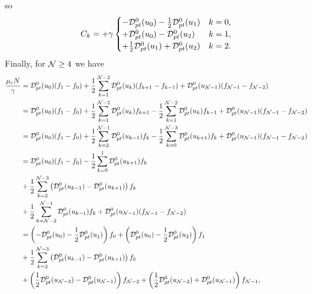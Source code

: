 \documentclass{book}
\begin{document}
so
\begin{equation}
	C_k = +\gamma\begin{cases}
			 -           {\cal D}_{pt}^0(u_0) - \frac{1}{2}{\cal D}_{pt}^0(u_{1}) & k=0, \\
			 +           {\cal D}_{pt}^0(u_0) -            {\cal D}_{pt}^0(u_{2}) & k=1, \\
			 +\frac{1}{2}{\cal D}_{pt}^0(u_1) +            {\cal D}_{pt}^0(u_{2}) & k=2.
	\end{cases}
\end{equation}
Finally, for ${\cal N} \geq 4$ we have
\begin{align*}
	\frac{\mu_eN}{\gamma}
	&=
		{\cal D}_{pt}^0(u_0)(f_{1}-f_{0})
		+ \frac{1}{2}\sum\limits_{k=1}^{{\cal N}-2}{\cal D}_{pt}^0(u_k)(f_{k+1}-f_{k-1})
		+ {\cal D}_{pt}^0(u_{{\cal N}-1})(f_{{\cal N}-1}-f_{{\cal N}-2})
	\\
	&=
		{\cal D}_{pt}^0(u_0)(f_{1}-f_{0})
		+ \frac{1}{2}\sum\limits_{k=1}^{{\cal N}-2}{\cal D}_{pt}^0(u_k)f_{k+1}
		- \frac{1}{2}\sum\limits_{k=1}^{{\cal N}-2}{\cal D}_{pt}^0(u_k)f_{k-1}
		+ {\cal D}_{pt}^0(u_{{\cal N}-1})(f_{{\cal N}-1}-f_{{\cal N}-2})
	\\
	&=
		{\cal D}_{pt}^0(u_0)(f_{1}-f_{0})
		+ \frac{1}{2}\sum\limits_{k=2}^{{\cal N}-1}{\cal D}_{pt}^0(u_{k-1})f_{k}
		- \frac{1}{2}\sum\limits_{k=0}^{{\cal N}-3}{\cal D}_{pt}^0(u_{k+1})f_{k}
		+ {\cal D}_{pt}^0(u_{{\cal N}-1})(f_{{\cal N}-1}-f_{{\cal N}-2})
	\\
	&=
		{\cal D}_{pt}^0(u_0)(f_{1}-f_{0})
		- \frac{1}{2}\sum\limits_{k=0}^{1}{\cal D}_{pt}^0(u_{k+1})f_{k}
	\\
	&
		+ \frac{1}{2}\sum\limits_{k=2}^{{\cal N}-3}\left({\cal D}_{pt}^0(u_{k-1}) - {\cal D}_{pt}^0(u_{k+1})\right)f_{k}
		\\
	&
		+ \frac{1}{2}\sum\limits_{k={{\cal N}-2}}^{{\cal N}-1}{\cal D}_{pt}^0(u_{k-1})f_{k}
		+ {\cal D}_{pt}^0(u_{{\cal N}-1})(f_{{\cal N}-1}-f_{{\cal N}-2})
	\\
	&=	  \left(-{\cal D}_{pt}^0(u_0) - \frac{1}{2}{\cal D}_{pt}^0(u_1)\right)f_{0}
			+\left( {\cal D}_{pt}^0(u_0) - \frac{1}{2}{\cal D}_{pt}^0(u_2)\right)f_{1} \\
		&+ \frac{1}{2}\sum\limits_{k=2}^{{\cal N}-3}\left({\cal D}_{pt}^0(u_{k-1}) - {\cal D}_{pt}^0(u_{k+1})\right)f_{k} \\
		&+\left( \frac{1}{2}{\cal D}_{pt}^0(u_{{\cal N}-3}) - {\cal D}_{pt}^0(u_{{\cal N}-1})\right)f_{{\cal N}-2}
			+\left( \frac{1}{2}{\cal D}_{pt}^0(u_{{\cal N}-2}) + {\cal D}_{pt}^0(u_{{\cal N}-1})\right)f_{{\cal N}-1},
\end{align*}
\end{document}
